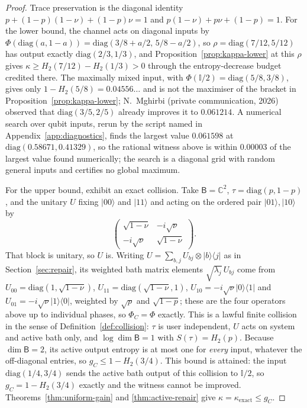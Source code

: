 \documentclass[11pt,a4paper]{article}
\numberwithin{equation}{section}
\theoremstyle{plain}
\theoremstyle{definition}
\newcommand{\rg}[1]{\mathsf{#1}}
\newcommand{\one}{\mathbb{I}}
\newcommand{\CC}{\mathbb{C}}
\newcommand{\kexact}{\kappa_{\mathrm{exact}}}
\newcommand{\ket}[1]{\lvert #1 \rangle}
\newcommand{\ketbra}[2]{\lvert #1 \rangle\langle #2 \rvert}
\begin{document}
\begin{proof}
Trace preservation is the diagonal identity
$p+(1-p)(1-\nu)+(1-p)\nu=1$ and $p(1-\nu)+p\nu+(1-p)=1$. For the lower
bound, the channel acts on diagonal inputs by
$\Phi(\mathrm{diag}(a,1-a))=\mathrm{diag}(3/8+a/2,\,5/8-a/2)$, so
$\rho=\mathrm{diag}(7/12,5/12)$ has output exactly $\mathrm{diag}(2/3,1/3)$,
and Proposition~\ref{prop:kappa-lower} at this $\rho$ gives
$\kappa\ge H_2(7/12)-H_2(1/3)>0$ through the entropy-decrease budget credited
there. The maximally mixed input, with $\Phi(\one/2)=\mathrm{diag}(5/8,3/8)$,
gives only $1-H_2(5/8)=0.04556\ldots$ and is not the maximiser of the bracket
in Proposition~\ref{prop:kappa-lower}; N.~Mghirbi (private communication,
2026) observed that $\mathrm{diag}(3/5,2/5)$ already improves it to
$0.061214$. A numerical search over qubit inputs, rerun by the script named
in Appendix~\ref{app:diagnostics}, finds the largest value $0.061598$ at
$\mathrm{diag}(0.58671,0.41329)$, so the rational witness above is within
$0.00003$ of the largest value found numerically; the search is a diagonal
grid with random general inputs and certifies no global maximum.

For the upper bound, exhibit an exact collision. Take $\rg{B}=\CC^2$,
$\tau=\mathrm{diag}(p,1-p)$, and the unitary $U$ fixing $\ket{00}$ and
$\ket{11}$ and acting on the ordered pair $\ket{01},\ket{10}$ by
\[
\begin{pmatrix}\sqrt{1-\nu} & -i\sqrt{\nu}\\
-i\sqrt{\nu} & \sqrt{1-\nu}\end{pmatrix}.
\]
That block is unitary, so $U$ is. Writing
$U=\sum_{b,j}U_{bj}\otimes\ketbra{b}{j}$ as in Section~\ref{sec:repair}, its
weighted bath matrix elements $\sqrt{\lambda_j}\,U_{bj}$ come from
$U_{00}=\mathrm{diag}(1,\sqrt{1-\nu})$,
$U_{11}=\mathrm{diag}(\sqrt{1-\nu},1)$,
$U_{10}=-i\sqrt{\nu}\ketbra{0}{1}$ and
$U_{01}=-i\sqrt{\nu}\ketbra{1}{0}$, weighted by $\sqrt{p}$ and
$\sqrt{1-p}$; these are the four operators above up to individual phases, so
$\Phi_C=\Phi$ exactly. This is a lawful finite collision in the sense of
Definition~\ref{def:collision}: $\tau$ is user independent, $U$ acts on system
and active bath only, and $\log\dim\rg{B}=1$ with $S(\tau)=H_2(p)$. Because
$\dim\rg{B}=2$, its active output entropy is at most one for \emph{every}
input, whatever the off-diagonal entries, so $g_C\le 1-H_2(3/4)$. This bound
is attained: the input $\mathrm{diag}(1/4,3/4)$ sends the active bath output
of this collision to $\one/2$, so $g_C=1-H_2(3/4)$ exactly and the witness
cannot be improved. Theorems~\ref{thm:uniform-gain} and
\ref{thm:active-repair} give $\kappa=\kexact\le g_C$.


\end{proof}
\end{document}
